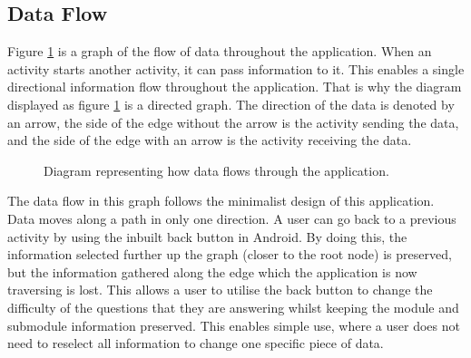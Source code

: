 \documentclass{article}
\begin{document}
\subsection{Data Flow}

Figure \ref{figure:applicationDataFlow} is a graph of the flow of data throughout the application. When an activity starts another activity, it can pass information to it. This enables a single directional information flow throughout the application. That is why the diagram displayed as figure \ref{figure:applicationDataFlow} is a directed graph. The direction of the data is denoted by an arrow, the side of the edge without the arrow is the activity sending the data, and the side of the edge with an arrow is the activity receiving the data. 

\begin{figure}[H]
	\centering
	\caption{Diagram representing how data flows through the application.}
	\label{figure:applicationDataFlow}
\end{figure}

The data flow in this graph follows the minimalist design of this application. Data moves along a path in only one direction. A user can go back to a previous activity by using the inbuilt back button in Android. By doing this, the information selected further up the graph (closer to the root node) is preserved, but the information gathered along the edge which the application is now traversing is lost. This allows a user to utilise the back button to change the difficulty of the questions that they are answering whilst keeping the module and submodule information preserved. This enables simple use, where a user does not need to reselect all information to change one specific piece of data. \par
\end{document}
